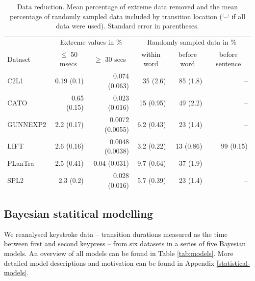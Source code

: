 \documentclass[
  man,floatsintext]{apa7}
\begin{document}
\begin{table}[bp!]

\begin{center}
\begin{threeparttable}

\caption{\label{tab:datareduction}Data reduction. Mean percentage of extreme data removed and the mean percentage of randomly sampled data included by transition location (`--` if all data were used). Standard error in parentheses.}

\begin{tabular}{lrrrrr}
\toprule
 \multicolumn{1}{c}{ } & \multicolumn{2}{c}{Extreme values in \%} & \multicolumn{3}{c}{Randomly sampled data in \%} \\
\cmidrule(r){1-1} \cmidrule(r){2-3} \cmidrule(r){4-6}
Dataset & \multicolumn{1}{c}{$\le$ 50 msecs} & \multicolumn{1}{c}{$\ge$ 30 secs} & \multicolumn{1}{c}{within word} & \multicolumn{1}{c}{before word} & \multicolumn{1}{c}{before sentence}\\
\midrule
C2L1 & 0.19 (0.1) & 0.074 (0.063) & 35 (2.6) & 85 (1.8) & --\\
CATO & 0.65 (0.15) & 0.023 (0.016) & 15 (0.95) & 49 (2.2) & --\\
GUNNEXP2 & 2.2 (0.17) & 0.0072 (0.0055) & 6.2 (0.43) & 23 (1.4) & --\\
LIFT & 2.6 (0.16) & 0.0048 (0.0038) & 3.2 (0.22) & 13 (0.86) & 99 (0.15)\\
PLanTra & 2.5 (0.41) & 0.04 (0.031) & 9.7 (0.64) & 37 (1.9) & --\\
SPL2 & 2.3 (0.2) & 0.028 (0.016) & 5.7 (0.39) & 23 (1.4) & --\\
\bottomrule
\end{tabular}

\end{threeparttable}
\end{center}

\end{table}

\hypertarget{bayesian-statitical-modelling}{%
\subsection{Bayesian statitical modelling}\label{bayesian-statitical-modelling}}

We reanalysed keystroke data -- transition durations measured as the time between first and second keypress -- from six datasets in a series of five Bayesian models. An overview of all models can be found in Table \ref{tab:models}. More detailed model descriptions and motivation can be found in Appendix \ref{statistical-models}.
\end{document}
